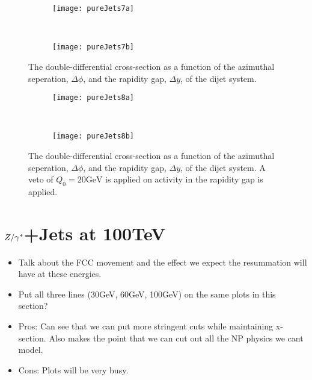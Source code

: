 	\begin{figure}[H]
		\centering
		\begin{subfigure}[b]{0.48\textwidth}
			\texttt{[image: pureJets7a]}
			\caption{}
			\label{fig:}
		\end{subfigure}
		~
		\begin{subfigure}[b]{0.48\textwidth}
			\texttt{[image: pureJets7b]}
			\caption{}
			\label{fig:}
		\end{subfigure}
		\caption{The double-differential cross-section as a function of the azimuthal seperation, $\Delta\phi$,
		         and the rapidity gap, $\Delta y$, of the dijet system.}
		\label{fig:}

		\begin{subfigure}[b]{0.48\textwidth}
			\texttt{[image: pureJets8a]}
			\caption{}
			\label{fig:}
		\end{subfigure}
		~
		\begin{subfigure}[b]{0.48\textwidth}
			\texttt{[image: pureJets8b]}
			\caption{}
			\label{fig:}
		\end{subfigure}
		\caption{The double-differential cross-section as a function of the azimuthal seperation, $\Delta\phi$,
		         and the rapidity gap, $\Delta y$, of the dijet system.  A veto of $Q_0=20\text{GeV}$ is applied
		         on activity in the rapidity gap is applied.}
		\label{fig:}
	\end{figure}

\chapter{$Z/\gamma^*$+Jets at 100TeV}
\label{chap:100TeV}

	\begin{itemize}
		\item Talk about the FCC movement and the effect we expect the resummation will have at these energies.
		\item Put all three lines (30GeV, 60GeV, 100GeV) on the same plots in this section?
		\item Pros: Can see that we can put more stringent cuts while maintaining x-section.  Also
		      makes the point that we can cut out all the NP physics we cant model.
		\item Cons: Plots will be very busy.
	\end{itemize}

